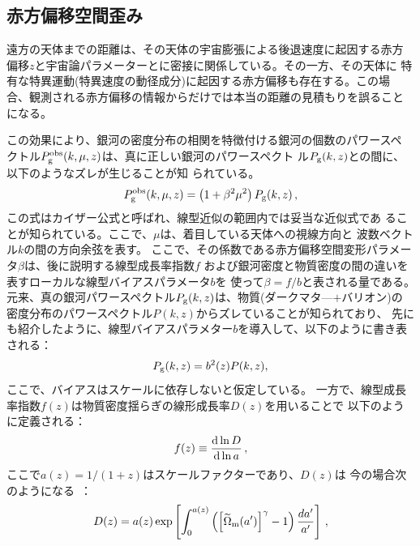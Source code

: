 \subsection{赤方偏移空間歪み}\label{cosmology.s2.ss2}

遠方の天体までの距離は、その天体の宇宙膨張による後退速度に起因する赤方
偏移$z$と宇宙論パラメーターとに密接に関係している。その一方、その天体に
特有な特異運動(特異速度の動径成分)に起因する赤方偏移も存在する。この場
合、観測される赤方偏移の情報からだけでは本当の距離の見積もりを誤ること
になる。

この効果により、銀河の密度分布の相関を特徴付ける銀河の個数のパワースペ
クトル$P_{\rm g}^{\rm obs}(k,\mu,z)$は、真に正しい銀河のパワースペクト
ル$P_{\rm g}(k,z)$との間に、以下のようなズレが生じることが知
られている。
\begin{eqnarray}
  \label{eq:Pobs}
  P_{\rm g}^{\rm obs}(k,\mu,z) = \left( 1 + \beta^2\mu^2\right) P_{\rm g}(k,z)
  \,,
\end{eqnarray}
この式はカイザー公式と呼ばれ、線型近似の範囲内では妥当な近似式であ
ることが知られている。ここで、$\mu$は、着目している天体への視線方向と
波数ベクトル\mbox{\boldmath $k$}の間の方向余弦を表す。
ここで、その係数である赤方偏移空間変形パラメータ$\beta$は、後に説明する線型成長率指数$f$
および銀河密度と物質密度の間の違いを表すローカルな線型バイアスパラメータ$b$を
使って$\beta= f/b$と表される量である。
元来、真の銀河パワースペクトル$P_{\rm g}(k,z)$は、物質(ダークマタ—$+$バリオン)の
密度分布のパワースペクトル$P(k,z)$からズレていることが知られており、
先にも紹介したように、線型バイアスパラメター$b$を導入して、以下のように書き表される：
\begin{eqnarray}
  \label{eq:biasedPgal}
  P_{\rm  g}(k,z)  = b^2(z) P(k,z),
\end{eqnarray}
ここで、バイアスはスケールに依存しないと仮定している。
一方で、線型成長率指数$f(z)$は物質密度揺らぎの線形成長率$D(z)$を用いることで
以下のように定義される：
\begin{eqnarray}
  \label{eq:growthrate}
  f(z) \equiv \frac{{\rm d} \ln D }{{\rm d} \ln a}
  \,,
\end{eqnarray}
ここで$a(z)=1/(1+z)$はスケールファクターであり、$D(z)$は
今の場合次のようになる~\citep{Linder:2005in}：
\begin{eqnarray}
  \label{eq:D-def}
  D(z) = a(z) \exp
    \left[
      \int_0^{a(z)}
      \left(
        \Bigl[\widetilde{\Omega}_{\rm m} (a')\Bigr]^\gamma - 1
      \right)
     \frac{d a'}{a'}
    \right]
   \,,
\end{eqnarray}
